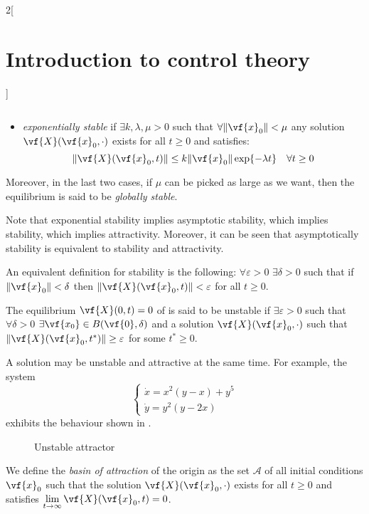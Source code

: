 \documentclass[../../../main_math.tex]{subfiles}
\begin{document}
\begin{multicols}{2}[\section{Introduction to control theory}]
\begin{definition}
\begin{itemize}
$$            $$
      \item \emph{exponentially stable} if $\exists k,\lambda,\mu>0$ such that $\forall\norm{\vf{x}_0}<\mu$ any solution $\vf{X}(\vf{x}_0, \cdot)$ exists for all $t\geq 0$ and satisfies:
            $$
              \norm{\vf{X}(\vf{x}_0, t)}\leq k\norm{\vf{x}_0} \exp{-\lambda t}\quad\forall t\geq 0
            $$
    \end{itemize}
    Moreover, in the last two cases, if $\mu$ can be picked as large as we want, then the equilibrium is said to be \emph{globally stable}.
  \end{definition}
  \begin{remark}
    Note that exponential stability implies asymptotic stability, which implies stability, which implies attractivity. Moreover, it can be seen that asymptotically stability is equivalent to stability and attractivity.
  \end{remark}
  \begin{remark}
    An equivalent definition for stability is the following: $\forall \varepsilon>0$ $\exists \delta>0$ such that if $\norm{\vf{x}_0}<\delta$ then $\norm{\vf{X}(\vf{x}_0, t)}<\varepsilon$ for all $t\geq 0$.
  \end{remark}
  \begin{definition}
    The equilibrium $\vf{X}(0, t)=0$ of  is said to be unstable if $\exists \varepsilon>0$ such that $\forall \delta>0$ $\exists \vf{x_0}\in B(\vf{0},\delta)$ and a solution $\vf{X}(\vf{x}_0, \cdot)$ such that $\norm{\vf{X}(\vf{x}_0, t^*)}\geq \varepsilon$ for some $t^*\geq 0$.
  \end{definition}
  \begin{remark}
    A solution may be unstable and attractive at the same time. For example, the system
    $$
      \begin{cases}
        \dot{x} = x^2(y-x) + y^5 \\
        \dot{y} = y^2(y-2x)
      \end{cases}
    $$
    exhibits the behaviour shown in .
    \begin{figure}[H]
      \centering
      
      \caption{Unstable attractor}
      \label{ICT:unstable_attractor}
    \end{figure}
  \end{remark}
  \begin{definition}
    We define the \emph{basin of attraction} of the origin as the set $\mathcal{A}$ of all initial conditions $\vf{x}_0$ such that the solution $\vf{X}(\vf{x}_0, \cdot)$ exists for all $t\geq 0$ and satisfies $\displaystyle\lim_{t\to\infty}\vf{X}(\vf{x}_0, t)=0$.

\end{definition}
\end{multicols}
\end{document}
